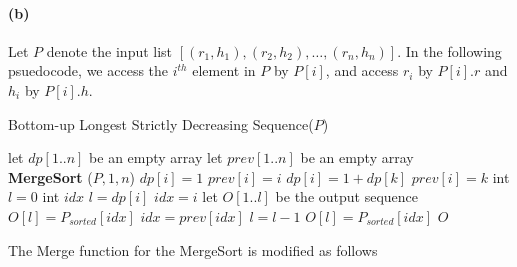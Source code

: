 \documentclass[12pt]{article}
\begin{document}
\paragraph{(b)} Let \(P\) denote the input list \([(r_1,h_1), (r_2,h_2), \hdots, (r_n,h_n)]\). In the following psuedocode, we access the \(i^{th}\) element in \(P\) by \(P[i]\), and access \(r_i\) by \(P[i].r\) and  \(h_i\) by \(P[i].h\).
\begin{algorithm}[H]
     \caption{Bottom-up Longest Strictly Decreasing Sequence(\(P\))}
     \begin{algorithmic}[1]
     \State let \(dp[1..n]\) be an empty array 
     \State let \(prev[1..n]\) be an empty array \\ 
     \State \textbf{MergeSort} (\(P, 1, n\)) 
          \State \(dp[i] = 1\)
          \State \(prev[i] = i\) 
                    \State \(dp[i] = 1 + dp[k]\)
                    \State \(prev[i] = k\)
               \EndIf
          \EndFor
     \EndFor
     \State int \(l = 0\)
     \State int \(idx\) 
               \State \(l = dp[i]\) 
               \State \(idx = i\) 
          \EndIf
     \EndFor
     \State let \(O[1..l]\) be the output sequence
          \State \(O[l] = P_{sorted}[idx]\)
          \State \(idx = prev[idx]\)
          \State \(l = l - 1\)
     \EndWhile
     \State \(O[l] = P_{sorted}[idx]\)
     \State \Return \(O\)
     \end{algorithmic}
\end{algorithm}
\noindent The Merge function for the MergeSort is modified as follows
\end{document}
